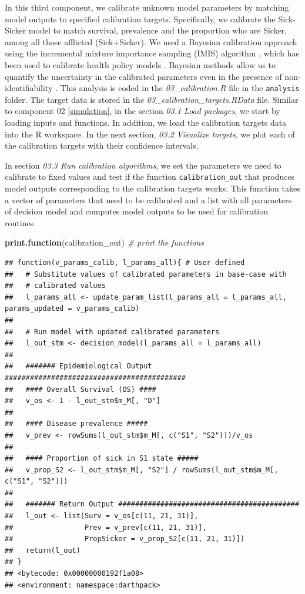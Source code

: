 \documentclass[]{book}
\newenvironment{Shaded}{\begin{snugshade}}{\end{snugshade}}
\newcommand{\CommentTok}[1]{\textcolor[rgb]{0.56,0.35,0.01}{\textit{#1}}}
\newcommand{\KeywordTok}[1]{\textcolor[rgb]{0.13,0.29,0.53}{\textbf{#1}}}
\newcommand{\NormalTok}[1]{#1}
\begin{document}
In this third component, we calibrate unknown model parameters by matching model outputs to specified calibration targets. Specifically, we calibrate the Sick-Sicker model to match survival, prevalence and the proportion who are Sicker, among all those afflicted (Sick+Sicker). We used a Bayesian calibration approach using the incremental mixture importance sampling (IMIS) algorithm \citep{Steele2006}, which has been used to calibrate health policy models \citep[\citet{Menzies2017}, \citet{Rutter2018}]{Raftery2010}. Bayesian methods allow us to quantify the uncertainty in the calibrated parameters even in the presence of non-identifiability \citep{Alarid-Escudero2018b}. This analysis is coded in the \emph{03\_calibration.R} file in the \texttt{analysis} folder. The target data is stored in the \emph{03\_calibration\_targets.RData} file. Similar to component 02 \ref{simulation}, in the section \emph{03.1 Load packages}, we start by loading inputs and functions. In addition, we load the calibration targets data into the R workspace. In the next section, \emph{03.2 Visualize targets}, we plot each of the calibration targets with their confidence intervals.

In section \emph{03.3 Run calibration algorithms}, we set the parameters we need to calibrate to fixed values and test if the function \texttt{calibration\_out} that produces model outputs corresponding to the calibration targets works. This function takes a vector of parameters that need to be calibrated and a list with all parameters of decision model and computes model outputs to be used for calibration routines.

\begin{Shaded}
\begin{Highlighting}[]
\KeywordTok{print.function}\NormalTok{(calibration_out) }\CommentTok{# print the functions}
\end{Highlighting}
\end{Shaded}

\begin{verbatim}
## function(v_params_calib, l_params_all){ # User defined
##   # Substitute values of calibrated parameters in base-case with 
##   # calibrated values
##   l_params_all <- update_param_list(l_params_all = l_params_all, params_updated = v_params_calib)
##   
##   # Run model with updated calibrated parameters
##   l_out_stm <- decision_model(l_params_all = l_params_all)
##   
##   ####### Epidemiological Output ###########################################
##   #### Overall Survival (OS) ####
##   v_os <- 1 - l_out_stm$m_M[, "D"]
##   
##   #### Disease prevalence #####
##   v_prev <- rowSums(l_out_stm$m_M[, c("S1", "S2")])/v_os
##   
##   #### Proportion of sick in S1 state #####
##   v_prop_S2 <- l_out_stm$m_M[, "S2"] / rowSums(l_out_stm$m_M[, c("S1", "S2")])
##   
##   ####### Return Output ###########################################
##   l_out <- list(Surv = v_os[c(11, 21, 31)],
##                 Prev = v_prev[c(11, 21, 31)],
##                 PropSicker = v_prop_S2[c(11, 21, 31)])
##   return(l_out)
## }
## <bytecode: 0x00000000192f1a08>
## <environment: namespace:darthpack>
\end{verbatim}
\end{document}
